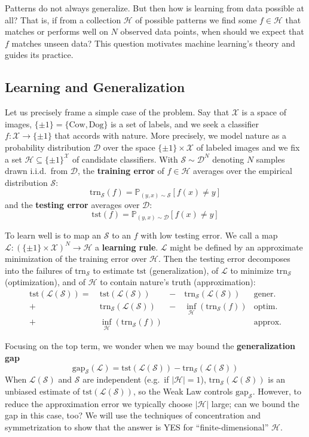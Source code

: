 \documentclass[twocolumn, 11pt]{article}
\newcommand{\PP}{\mathbb{P}}
\newcommand{\Dd}{\mathcal{D}}
\newcommand{\Ee}{\mathcal{E}}
\newcommand{\Hh}{\mathcal{H}}
\newcommand{\Ll}{\mathcal{L}}
\newcommand{\Ss}{\mathcal{S}}
\newcommand{\Uu}{\mathcal{U}}
\newcommand{\Xx}{\mathcal{X}}
\newcommand{\Ein} {\text{trn}_{\Ss}} %
\newcommand{\Egap}{\text{gap}_{\Ss}}
\newcommand{\Eout}{\text{tst}} %
\theoremstyle{definition}
\newcommand{\msec}[1]{\subsection*{\color{mblu}\textsf{#1}}}
\begin{document}
        Patterns do not always generalize.  But then how is learning from 
        data
        possible at all? 
        That is, if from a collection $\Hh$ of possible patterns we find
        some $f\in \Hh$ that matches or performs well on $N$ observed data
        points, when should we expect that $f$ matches unseen data?  This
        question motivates machine learning's theory and guides its practice.

    \msec{Learning and Generalization}
        Let us precisely frame a simple case of the problem.
        Say that $\Xx$ is a space of images, $\{\pm 1\} =
        \{\text{Cow}, \text{Dog}\}$ is a set of labels, and we seek a
        classifier $f: \Xx\to\{\pm 1\}$ that accords with nature.  More
        precisely, we model nature as a probability distribution $\Dd$ over the
        space $\{\pm 1\}\times\Xx$ of labeled images and we fix a set $\Hh
        \subseteq \{\pm 1\}^\Xx$ of candidate classifiers.  With $\Ss \sim
        \Dd^N$ denoting $N$ samples drawn i.i.d.\ from $\Dd$, the
        \textbf{training error} of $f\in \Hh$ averages over the empirical
        distribution $\Ss$:
        $$
            \Ein(f) = \PP_{(y,x)\sim \Ss}[f(x)\neq y] 
        $$
        and the \textbf{testing error} averages over $\Dd$:
        $$
            \Eout(f) = \PP_{(y,x)\sim \Dd}[f(x)\neq y] 
        $$

        To learn well is to map an $\Ss$ to an $f$ with low testing error.  We
        call a map $\Ll: (\{\pm 1\}\times\Xx)^N \to \Hh$ a \textbf{learning
        rule}.  $\Ll$ might be defined by an approximate minimization of the
        training error over $\Hh$.  Then the testing error decomposes into the
        failures
        of $\Ein$ to estimate $\Eout$ (generalization),
        of $\Ll$ to minimize $\Ein$ (optimization), and 
        of $\Hh$ to contain nature's truth (approximation): 
        \newcommand{\minf}[1]{{\inf}_{\Hh}}%
        \begin{align*}
            \Eout(\Ll(\Ss)) 
            =~&\Eout(\Ll(\Ss))           &-~&           \Ein(\Ll(\Ss))& \text{gener.} \\
            +~&\Ein(\Ll(\Ss))            &-~& \minf{\Hh}(\Ein(f))& \text{optim.} \\
            +~&\minf{\Hh}(\Ein(f))  &  &                         & \text{approx.}  
        \end{align*}
        
        Focusing on the top term, we wonder when we may bound the
        \textbf{generalization gap} 
        $$
            \Egap(\Ll) = \Eout(\Ll(\Ss)) - \Ein(\Ll(\Ss)) 
        $$
        When $\Ll(\Ss)$ and $\Ss$ are independent (e.g.\ if $|\Hh|=1$),
        $\Ein(\Ll(\Ss))$ is an unbiased estimate of $\Eout(\Ll(\Ss))$, so the
        Weak Law controls $\Egap$.  However, to reduce the approximation error
        we typically choose $|\Hh|$ large; can we bound the gap in
        this case, too?
        We will use the techniques of concentration and symmetrization to show
        that the answer is YES for ``finite-dimensional'' $\Hh$.
\end{document}
